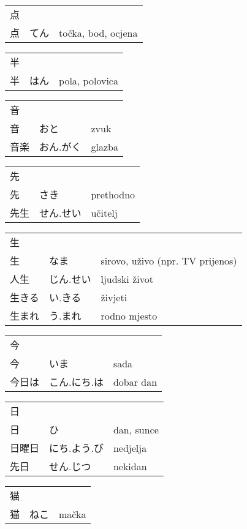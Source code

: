 

\newenvironment{dictentry}[1]{
	\begin{tabular}{p{2cm} p{3cm} p{10cm}}
		#1 &&\\
}{
	\end{tabular}
	\vspace{20pt}
}

\newcommand{\example}[3]{
	\hspace*{\fill}#1 & #2 & #3\\
}

\author{ロボット君}


\begin{dictentry}{点}
\example{点}{てん}{točka, bod, ocjena}
\end{dictentry}

\begin{dictentry}{半}
\example{半}{はん}{pola, polovica}
\end{dictentry}

\begin{dictentry}{音}
\example{音}{おと}{zvuk}
\example{音楽}{おん.がく}{glazba}
\end{dictentry}

\begin{dictentry}{先}
\example{先}{さき}{prethodno}
\example{先生}{せん.せい}{učitelj}
\end{dictentry}

\begin{dictentry}{生}
\example{生}{なま}{sirovo, uživo (npr. TV prijenos)}
\example{人生}{じん.せい}{ljudski život}
\example{生きる}{い.きる}{živjeti}
\example{生まれ}{う.まれ}{rodno mjesto}
\end{dictentry}

\begin{dictentry}{今}
\example{今}{いま}{sada}
\example{今日は}{こん.にち.は\footnotemark[1]}{dobar dan}
\end{dictentry}

\begin{dictentry}{日}
\example{日}{ひ}{dan, sunce}
\example{日曜日}{にち.よう.び}{nedjelja}
\example{先日}{せん.じつ}{nekidan}
\end{dictentry}

\begin{dictentry}{猫}
\example{猫}{ねこ}{mačka}
\end{dictentry}

